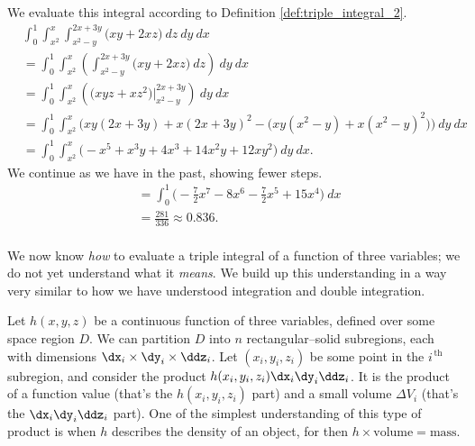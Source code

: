 {We evaluate this integral according to Definition \ref{def:triple_integral_2}.\\


\enlargethispage{2\baselineskip}
\begin{align*}
&\int_0^1\int_{x^2}^x\int_{x^2-y}^{2x+3y} \big(xy+2xz\big)\ dz\ dy\ dx\\ 
&=	\int_0^1\int_{x^2}^x\left(\int_{x^2-y}^{2x+3y} \big(xy+2xz\big)\ dz\right)\ dy\ dx\\
&= \int_0^1\int_{x^2}^x\left(\big(xyz+ xz^2\big)\Big|_{x^2-y}^{2x+3y}\right)\ dy\ dx\\
	&= \int_0^1\int_{x^2}^x\Bigg(xy(2x+3y)+x(2x+3y)^2-\Big(xy(x^2-y)+x(x^2-y)^2\Big)\Bigg)\ dy\ dx\\
	&=\int_0^1\int_{x^2}^x\Big(-x^5+x^3y+4x^3+14x^2y+12xy^2\Big)\ dy\ dx.\end{align*}
	We continue as we have in the past, showing fewer steps.
\begin{align*}
			&= \int_0^1\Bigg(-\frac72x^7-8x^6-\frac72x^5+15x^4\Bigg)\ dx\\
			&= \frac{281}{336}\approx 0.836.
\end{align*}
\baselineskip
}\\

We now know \textit{how} to evaluate a triple integral of a function of three variables; we do not yet understand what it \textit{means}. We build up this understanding in a way very similar to how we have understood integration and double integration.

Let $h(x,y,z)$ be a continuous function of three variables, defined over some space region $D$. We can partition $D$ into $n$ rectangular--solid subregions, each with dimensions $\dx_i\times\dy_i\times\ddz_i$. Let $(x_i,y_i,z_i)$ be some point in the $i^{\,\text{th}}$ subregion, and consider the product $h(x_i,y_i,z_i)\dx_i\dy_i\ddz_i$. It is the product of a function value (that's the $h(x_i,y_i,z_i)$ part) and a small volume $\Delta V_i$ (that's the $\dx_i\dy_i\ddz_i$ part). One of the simplest understanding of this type of product is when $h$ describes the density of an object, for then $h\times\text{volume}=\text{mass}$.

